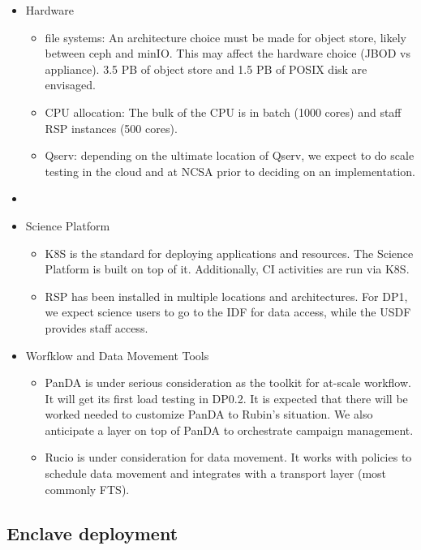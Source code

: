 \begin{itemize}
  \item Hardware
  \begin{itemize}
    \item file systems: An architecture choice must be made for object
      store, likely between ceph and minIO. This may affect the
      hardware choice (JBOD vs appliance). 3.5 PB of object store and
      1.5 PB of POSIX disk are envisaged.
    \item CPU allocation: The bulk of the CPU is in batch (1000 cores)
      and staff RSP instances (500 cores).
      \item Qserv: depending on the ultimate location of Qserv, we
        expect to do scale testing in the cloud and at NCSA prior to
        deciding on an implementation. 
  \end{itemize}

\item
  \item Science Platform
  \begin{itemize}
      \item \gls{K8S} is the standard for deploying applications and
        resources. The Science Platform is built on top of
        it. Additionally, \gls{CI} activities are run via K8S.
      \item \gls{RSP} has been installed in multiple locations and
        architectures. For DP1, we expect science users to go to the
        IDF for data access, while the USDF provides staff access.
  \end{itemize}

\item Worfklow and Data Movement Tools
\begin{itemize}
      \item \gls{PanDA} is under serious consideration as the toolkit
        for at-scale workflow. It will get its first load testing in
        DP0.2. It is expected that there will be worked needed to
        customize PanDA to Rubin's situation. We also anticipate a
        layer on top of PanDA to orchestrate campaign management.
      \item Rucio is under consideration for data movement. It
       works with policies to schedule data movement and integrates
       with a transport layer (most commonly FTS).
  \end{itemize}

\end{itemize}

\subsection {Enclave deployment}

